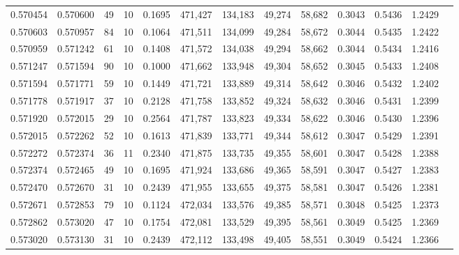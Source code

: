 \begin{tabular}{rrrrrrrrrrrrr}
0.570454 & 0.570600 &    49 &  10 &                                     0.1695 & 471,427 & 134,183 &  49,274 &  58,682 & 0.3043 & 0.5436 & 1.2429 \\
0.570603 & 0.570957 &    84 &  10 &                                     0.1064 & 471,511 & 134,099 &  49,284 &  58,672 & 0.3044 & 0.5435 & 1.2422 \\
0.570959 & 0.571242 &    61 &  10 &                                     0.1408 & 471,572 & 134,038 &  49,294 &  58,662 & 0.3044 & 0.5434 & 1.2416 \\
0.571247 & 0.571594 &    90 &  10 &                                     0.1000 & 471,662 & 133,948 &  49,304 &  58,652 & 0.3045 & 0.5433 & 1.2408 \\
0.571594 & 0.571771 &    59 &  10 &                                     0.1449 & 471,721 & 133,889 &  49,314 &  58,642 & 0.3046 & 0.5432 & 1.2402 \\
0.571778 & 0.571917 &    37 &  10 &                                     0.2128 & 471,758 & 133,852 &  49,324 &  58,632 & 0.3046 & 0.5431 & 1.2399 \\
0.571920 & 0.572015 &    29 &  10 &                                     0.2564 & 471,787 & 133,823 &  49,334 &  58,622 & 0.3046 & 0.5430 & 1.2396 \\
0.572015 & 0.572262 &    52 &  10 &                                     0.1613 & 471,839 & 133,771 &  49,344 &  58,612 & 0.3047 & 0.5429 & 1.2391 \\
0.572272 & 0.572374 &    36 &  11 &                                     0.2340 & 471,875 & 133,735 &  49,355 &  58,601 & 0.3047 & 0.5428 & 1.2388 \\
0.572374 & 0.572465 &    49 &  10 &                                     0.1695 & 471,924 & 133,686 &  49,365 &  58,591 & 0.3047 & 0.5427 & 1.2383 \\
0.572470 & 0.572670 &    31 &  10 &                                     0.2439 & 471,955 & 133,655 &  49,375 &  58,581 & 0.3047 & 0.5426 & 1.2381 \\
0.572671 & 0.572853 &    79 &  10 &                                     0.1124 & 472,034 & 133,576 &  49,385 &  58,571 & 0.3048 & 0.5425 & 1.2373 \\
0.572862 & 0.573020 &    47 &  10 &                                     0.1754 & 472,081 & 133,529 &  49,395 &  58,561 & 0.3049 & 0.5425 & 1.2369 \\
0.573020 & 0.573130 &    31 &  10 &                                     0.2439 & 472,112 & 133,498 &  49,405 &  58,551 & 0.3049 & 0.5424 & 1.2366 \\

\end{tabular}
